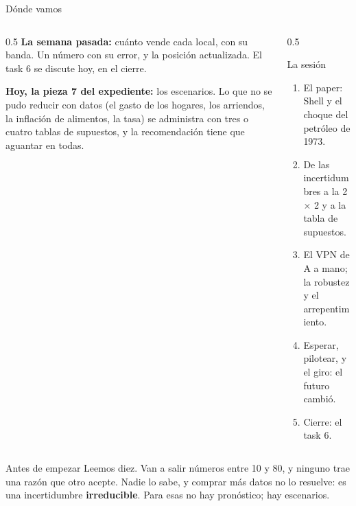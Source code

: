 \documentclass{beamer}
\begin{document}
\begin{frame}
\titlepage
\end{frame}

\begin{frame}{Dónde vamos}
\begin{columns}[T]
\begin{column}{0.5\textwidth}
\textbf{La semana pasada:} cuánto vende cada local, con su banda. Un número con su error, y la posición actualizada. El task 6 se discute hoy, en el cierre.

\medskip
\textbf{Hoy, la pieza 7 del expediente:} los escenarios. Lo que no se pudo reducir con datos (el gasto de los hogares, los arriendos, la inflación de alimentos, la tasa) se administra con tres o cuatro tablas de supuestos, y la recomendación tiene que aguantar en todas.
\end{column}
\begin{column}{0.5\textwidth}
\begin{block}{La sesión}
\begin{enumerate}
  \item El paper: Shell y el choque del petróleo de 1973.
  \item De las incertidumbres a la 2 $\times$ 2 y a la tabla de supuestos.
  \item El VPN de A a mano; la robustez y el arrepentimiento.
  \item Esperar, pilotear, y el giro: el futuro cambió.
  \item Cierre: el task 6.
\end{enumerate}
\end{block}
\end{column}
\end{columns}
\end{frame}

\begin{frame}{Antes de empezar}
\medskip
\small Leemos diez. Van a salir números entre 10 y 80, y ninguno trae una razón que otro acepte. Nadie lo sabe, y comprar más datos no lo resuelve: es una incertidumbre \textbf{irreducible}. Para esas no hay pronóstico; hay escenarios.
\end{frame}
\end{document}
